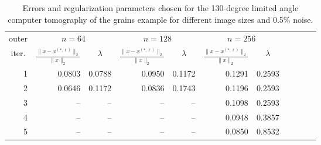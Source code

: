 \begin{table}[htp]
\caption{Errors and regularization parameters chosen for the 130-degree limited angle computer tomography of the grains example for different image sizes and 0.5\% noise.}
\begin{center}
\begin{tabular}{|r|r|r|r|r|r|r|r|r|r|r|}
\hline
\multicolumn{1}{|c|}{outer} & \multicolumn{2}{c|}{$n = 64$} & \multicolumn{2}{c|}{$n = 128$} & \multicolumn{2}{c|}{$n = 256$} \\\cline{2-7}
\multicolumn{1}{|c|}{iter.} & \multicolumn{1}{c|}{$\frac{\|x - x^{(*,\ell)}\|_2}{\|x\|_2}$}& \multicolumn{1}{c|}{$\lambda$} & \multicolumn{1}{c|}{$\frac{\|x - x^{(*,\ell)}\|_2}{\|x\|_2}$} & \multicolumn{1}{c|}{$\lambda$} & \multicolumn{1}{c|}{$\frac{\|x - x^{(*,\ell)}\|_2}{\|x\|_2}$} & \multicolumn{1}{c|}{$\lambda$} \\
\hline
1 & 0.0803 & 0.0788 & 0.0950 & 0.1172 & 0.1291 & 0.2593 \\
2 & 0.0646 & 0.1172 & 0.0836 & 0.1743 & 0.1196 & 0.2593 \\
3 & -- & -- & -- & -- & 0.1098 & 0.2593 \\
4 & -- & -- & -- & -- & 0.0948 & 0.3857 \\
5 & -- & -- & -- & -- & 0.0850 & 0.8532 \\
\hline
\end{tabular}
\end{center}
\label{tab:limited_angle_grains_errs_and_reg_params}
\end{table}%
